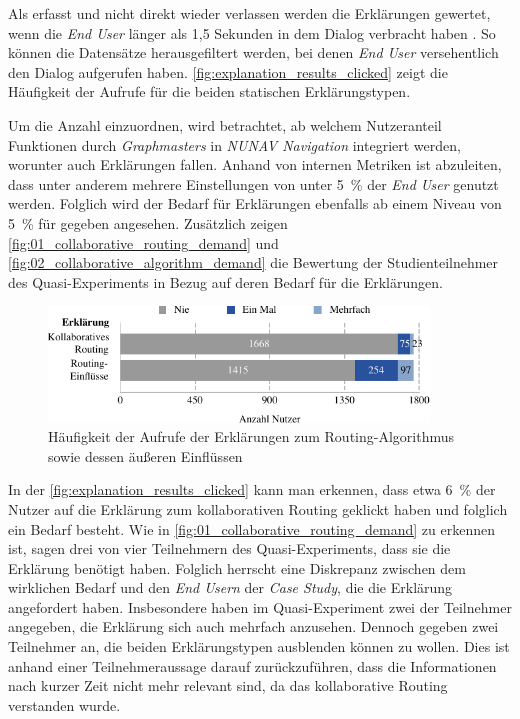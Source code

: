 Als erfasst und nicht direkt wieder verlassen werden die Erklärungen gewertet, wenn die \textit{End User} länger als 1,5 Sekunden in dem Dialog verbracht haben \cite{BAHR2011776}. So können die Datensätze herausgefiltert werden, bei denen \textit{End User} versehentlich den Dialog aufgerufen haben. \autoref{fig:explanation_results_clicked} zeigt die Häufigkeit der Aufrufe für die beiden statischen Erklärungstypen.

Um die Anzahl einzuordnen, wird betrachtet, ab welchem Nutzeranteil Funktionen durch \textit{Graphmasters} in \textit{NUNAV Navigation} integriert werden, worunter auch Erklärungen fallen. Anhand von internen Metriken ist abzuleiten, dass unter anderem mehrere Einstellungen von unter 5~\% der \textit{End User} genutzt werden. Folglich wird der Bedarf für Erklärungen ebenfalls ab einem Niveau von 5~\% für gegeben angesehen. Zusätzlich zeigen \autoref{fig:01_collaborative_routing_demand} und \autoref{fig:02_collaborative_algorithm_demand} die Bewertung der Studienteilnehmer des Quasi-Experiments in Bezug auf deren Bedarf für die Erklärungen.

\begin{figure}[htb!]
    \centering
    \includegraphics[width=0.9\textwidth]{contents/06_model_evaluation/02_evaluation/res/explanation_results_clicked.pdf}
    \caption{Häufigkeit der Aufrufe der Erklärungen zum Routing-Algorithmus sowie dessen äußeren Einflüssen}
    \label{fig:explanation_results_clicked}
\end{figure}

In der \autoref{fig:explanation_results_clicked} kann man erkennen, dass etwa 6~\% der Nutzer auf die Erklärung zum kollaborativen Routing geklickt haben und folglich ein Bedarf besteht. Wie in \autoref{fig:01_collaborative_routing_demand} zu erkennen ist, sagen drei von vier Teilnehmern des Quasi-Experiments, dass sie die Erklärung benötigt haben. Folglich herrscht eine Diskrepanz zwischen dem wirklichen Bedarf und den \textit{End Usern} der \textit{Case Study}, die die Erklärung angefordert haben. Insbesondere haben im Quasi-Experiment zwei der Teilnehmer angegeben, die Erklärung sich auch mehrfach anzusehen. Dennoch gegeben zwei Teilnehmer an, die beiden Erklärungstypen ausblenden können zu wollen. Dies ist anhand einer Teilnehmeraussage darauf zurückzuführen, dass die Informationen nach kurzer Zeit nicht mehr relevant sind, da das kollaborative Routing verstanden wurde.

